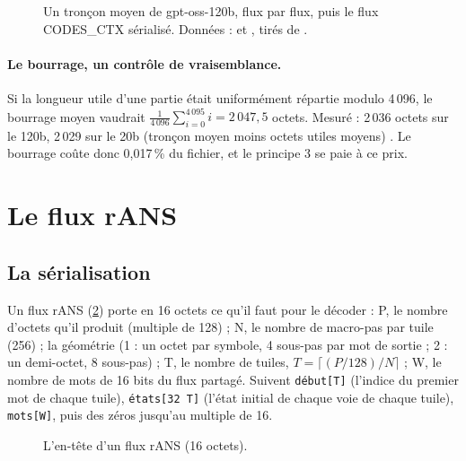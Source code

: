 \begin{figure}[ht]
\centering
\TdFmtPartie
\caption[Un tronçon moyen et un flux CODES\_CTX]{Un tronçon moyen de gpt-oss-120b, flux par flux, puis le flux CODES\_CTX sérialisé. Données :  et , tirés de .}
\label{t2fmt:fig:partie}
\end{figure}

\paragraph{Le bourrage, un contrôle de vraisemblance.} Si la longueur utile d'une partie était uniformément répartie modulo 4\,096, le bourrage moyen vaudrait $\frac{1}{4\,096}\sum_{i=0}^{4\,095} i = 2\,047{,}5$ octets. Mesuré : 2\,036 octets sur le 120b, 2\,029 sur le 20b (tronçon moyen moins octets utiles moyens) \calc. Le bourrage coûte donc 0,017\,\% du fichier, et le principe 3 se paie à ce prix.

\section{Le flux rANS}\label{t2fmt:sec:rans}

\subsection{La sérialisation}

Un flux rANS (\cref{t2fmt:fig:flux-entete}) porte en 16 octets ce qu'il faut pour le décoder : P, le nombre d'octets qu'il produit (multiple de 128) ; N, le nombre de macro-pas par tuile (256) ; la géométrie (1 : un octet par symbole, 4 sous-pas par mot de sortie ; 2 : un demi-octet, 8 sous-pas) ; T, le nombre de tuiles, $T = \lceil (P/128)/N \rceil$ ; W, le nombre de mots de 16 bits du flux partagé. Suivent \texttt{début[T]} (l'indice du premier mot de chaque tuile), \texttt{états[32\,T]} (l'état initial de chaque voie de chaque tuile), \texttt{mots[W]}, puis des zéros jusqu'au multiple de 16.

\begin{figure}[ht]
\centering
\TdFmtFluxEntete
\caption[L'en-tête d'un flux rANS]{L'en-tête d'un flux rANS (16 octets).}
\label{t2fmt:fig:flux-entete}
\end{figure}


